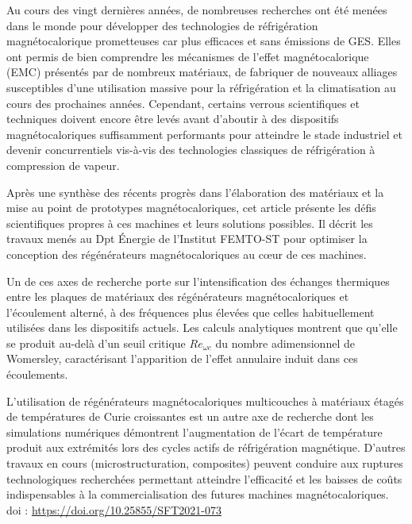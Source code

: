 {\normalsize
Au cours des vingt dernières années, de nombreuses recherches ont été menées dans le monde pour développer des technologies de réfrigération magnétocalorique prometteuses car plus efficaces et sans émissions de GES. Elles ont permis de bien comprendre les mécanismes de l’effet magnétocalorique (EMC) présentés par de nombreux matériaux, de fabriquer de nouveaux alliages susceptibles d’une utilisation massive pour la réfrigération et la climatisation au cours des prochaines années. Cependant, certains verrous scientifiques et techniques doivent encore être levés avant d’aboutir à des dispositifs magnétocaloriques suffisamment performants pour atteindre le stade industriel et devenir concurrentiels vis-à-vis des technologies classiques de réfrigération à compression de vapeur.

Après une synthèse des récents progrès dans l’élaboration des matériaux et la mise au point de prototypes magnétocaloriques, cet article présente les défis scientifiques propres à ces machines et leurs solutions possibles. Il décrit les travaux menés au Dpt Énergie de l’Institut FEMTO-ST pour optimiser la conception des régénérateurs magnétocaloriques au cœur de ces machines.

Un de ces axes de recherche porte sur l’intensification des échanges thermiques entre les plaques de matériaux des régénérateurs magnétocaloriques et l’écoulement alterné, à des fréquences plus élevées que celles habituellement utilisées dans les dispositifs actuels. Les calculs analytiques montrent que qu’elle se produit au-delà d’un seuil critique $Re_{\omega c}$ du nombre adimensionnel de Womersley, caractérisant l’apparition de l’effet annulaire induit dans ces écoulements.

L’utilisation de régénérateurs magnétocaloriques multicouches à matériaux étagés de températures de Curie croissantes est un autre axe de recherche dont les simulations numériques démontrent l’augmentation de l’écart de température produit aux extrémités lors des cycles actifs de réfrigération magnétique. D’autres travaux en cours (microstructuration, composites) peuvent conduire aux ruptures technologiques recherchées permettant atteindre l’efficacité et les baisses de coûts indispensables à la commercialisation des futures machines magnétocaloriques.
 \vfill doi : \url{https://doi.org/10.25855/SFT2021-073}

}
 
